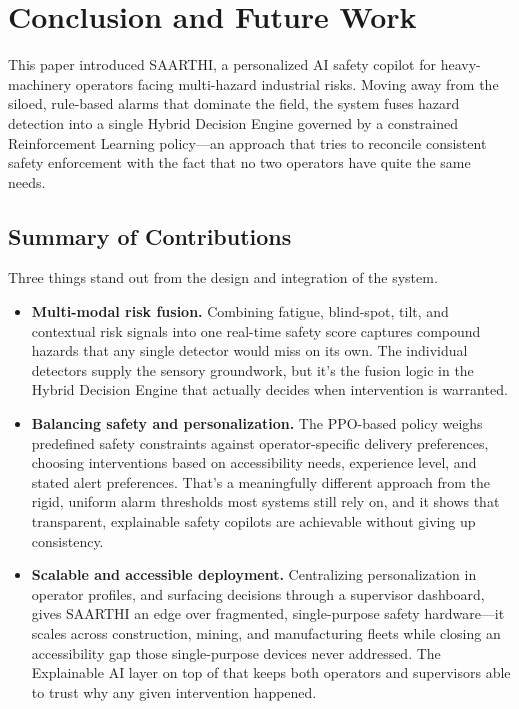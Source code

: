 \section{Conclusion and Future Work}
This paper introduced SAARTHI, a personalized AI safety copilot for heavy-machinery operators facing multi-hazard industrial risks. Moving away from the siloed, rule-based alarms that dominate the field, the system fuses hazard detection into a single Hybrid Decision Engine governed by a constrained Reinforcement Learning policy---an approach that tries to reconcile consistent safety enforcement with the fact that no two operators have quite the same needs.

\subsection{Summary of Contributions}
Three things stand out from the design and integration of the system.

\begin{itemize}
    \item \textbf{Multi-modal risk fusion.} Combining fatigue, blind-spot, tilt, and contextual risk signals into one real-time safety score captures compound hazards that any single detector would miss on its own. The individual detectors supply the sensory groundwork, but it's the fusion logic in the Hybrid Decision Engine that actually decides when intervention is warranted.
    \item \textbf{Balancing safety and personalization.} The PPO-based policy weighs predefined safety constraints against operator-specific delivery preferences, choosing interventions based on accessibility needs, experience level, and stated alert preferences. That's a meaningfully different approach from the rigid, uniform alarm thresholds most systems still rely on, and it shows that transparent, explainable safety copilots are achievable without giving up consistency.
    \item \textbf{Scalable and accessible deployment.} Centralizing personalization in operator profiles, and surfacing decisions through a supervisor dashboard, gives SAARTHI an edge over fragmented, single-purpose safety hardware---it scales across construction, mining, and manufacturing fleets while closing an accessibility gap those single-purpose devices never addressed. The Explainable AI layer on top of that keeps both operators and supervisors able to trust why any given intervention happened.
\end{itemize}

